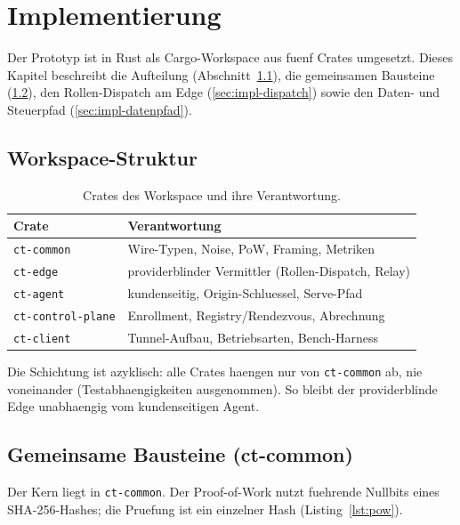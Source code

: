 \chapter{Implementierung}
\label{ch:implementierung}

Der Prototyp ist in Rust als Cargo-Workspace aus fuenf Crates umgesetzt. Dieses
Kapitel beschreibt die Aufteilung (Abschnitt~\ref{sec:impl-workspace}), die
gemeinsamen Bausteine (\ref{sec:impl-common}), den Rollen-Dispatch am Edge
(\ref{sec:impl-dispatch}) sowie den Daten- und Steuerpfad
(\ref{sec:impl-datenpfad}).

\section{Workspace-Struktur}
\label{sec:impl-workspace}

\begin{table}[t]
  \centering
  \caption{Crates des Workspace und ihre Verantwortung.}
  \label{tab:crates}
  \begin{tabular}{ll}
    \toprule
    Crate & Verantwortung \\
    \midrule
    \texttt{ct-common} & Wire-Typen, Noise, PoW, Framing, Metriken \\
    \texttt{ct-edge} & providerblinder Vermittler (Rollen-Dispatch, Relay) \\
    \texttt{ct-agent} & kundenseitig, Origin-Schluessel, Serve-Pfad \\
    \texttt{ct-control-plane} & Enrollment, Registry/Rendezvous, Abrechnung \\
    \texttt{ct-client} & Tunnel-Aufbau, Betriebsarten, Bench-Harness \\
    \bottomrule
  \end{tabular}
\end{table}

Die Schichtung ist azyklisch: alle Crates haengen nur von \texttt{ct-common} ab,
nie voneinander (Testabhaengigkeiten ausgenommen). So bleibt der providerblinde
Edge unabhaengig vom kundenseitigen Agent.

\section{Gemeinsame Bausteine (ct-common)}
\label{sec:impl-common}

Der Kern liegt in \texttt{ct-common}. Der Proof-of-Work nutzt fuehrende Nullbits
eines SHA-256-Hashes; die Pruefung ist ein einzelner Hash (Listing~\ref{lst:pow}).

